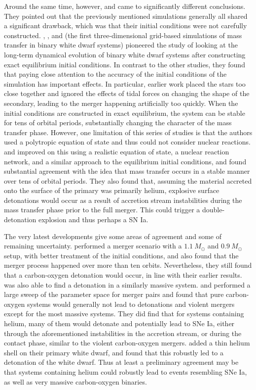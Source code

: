 \documentclass[12pt,preprint]{aastex}
\begin{document}
Around the same time, however, \cite{guillochon:2010} and \cite{dan:2011} came to significantly different conclusions. They pointed out that the previously mentioned simulations generally all shared a significant drawback, which was that their initial conditions were not carefully constructed. \cite{motl:2002}, \cite{dsouza:2006}, and \cite{motl:2007} (the first three-dimensional grid-based simulations of mass transfer in binary white dwarf systems) pioneered the study of looking at the long-term dynamical evolution of binary white dwarf systems after constructing exact equilibrium initial conditions. In contrast to the other studies, they found that paying close attention to the accuracy of the initial conditions of the simulation has important effects. In particular, earlier work placed the stars too close together and ignored the effects of tidal forces on changing the shape of the secondary, leading to the merger happening artificially too quickly. When the initial conditions are constructed in exact equilibrium, the system can be stable for tens of orbital periods, substantially changing the character of the mass transfer phase. However, one limitation of this series of studies is that the authors used a polytropic equation of state and thus could not consider nuclear reactions. \cite{guillochon:2010} and \cite{dan:2011} improved on this using a realistic equation of state, a nuclear reaction network, and a similar approach to the equilibrium initial conditions, and found substantial agreement with the idea that mass transfer occurs in a stable manner over tens of orbital periods. They also found that, assuming the material accreted onto the surface of the primary was primarily helium, explosive surface detonations would occur as a result of accretion stream instabilities during the mass transfer phase prior to the full merger. This could trigger a double-detonation explosion and thus perhaps a SN Ia.

The very latest developments give some areas of agreement and some of remaining uncertainty. \cite{pakmor:2012} performed a merger scenario with a $1.1\ M_\odot$ and $0.9\ M_\odot$ setup, with better treatment of the initial conditions, and also found that the merger process happened over more than ten orbits. Nevertheless, they still found that a carbon-oxygen detonation would occur, in line with their earlier results. \cite{moll:2014} was also able to find a detonation in a similarly massive system. \cite{dan:2012} and \cite{dan:2014} performed a large sweep of the parameter space for merger pairs and found that pure carbon-oxygen systems would generally not lead to detonations and violent mergers except for the most massive systems. They did find that for systems containing helium, many of them would detonate and potentially lead to SNe Ia, either through the aforementioned instabilities in the accretion stream, or during the contact phase, similar to the violent carbon-oxygen mergers. \cite{pakmor:2013} added a thin helium shell on their primary white dwarf, and found that this robustly led to a detonation of the white dwarf. Thus at least a preliminary agreement may be that systems containing helium could robustly lead to events resembling SNe Ia, as well as very massive carbon-oxygen binaries.
\end{document}
